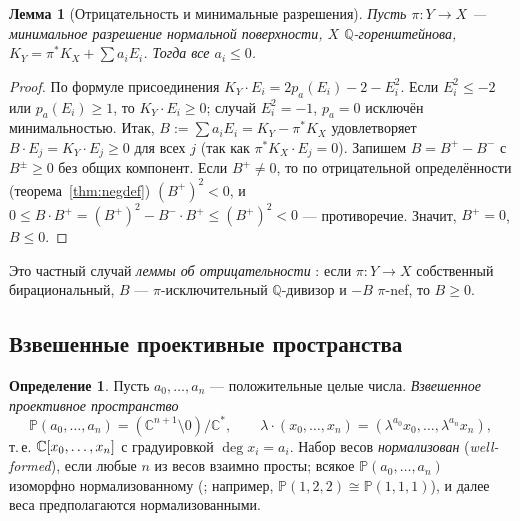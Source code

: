 \documentclass[11pt,a4paper]{article}
\theoremstyle{plain}
\newtheorem{lemma}[theorem]{Лемма}
\theoremstyle{definition}
\newtheorem{definition}[theorem]{Определение}
\theoremstyle{remark}
\renewcommand{\C}{\mathbb{C}}
\newcommand{\Q}{\mathbb{Q}}
\newcommand{\PP}{\mathbb{P}}
\let\Proj\relax
\DeclareMathOperator{\Proj}{Proj}
\begin{document}
\begin{lemma}[Отрицательность и минимальные разрешения]\label{lem:minimal-discrep}
Пусть $\pi\colon Y\to X$ --- минимальное разрешение нормальной поверхности, $X$ $\Q$-горенштейнова,
$K_Y=\pi^*K_X+\sum a_iE_i$. Тогда все $a_i\le0$.
\end{lemma}
\begin{proof}
По формуле присоединения \cite[V, упр.~1.3]{Ha} $K_Y\cdot E_i=2p_a(E_i)-2-E_i^2$. Если $E_i^2\le-2$ или
$p_a(E_i)\ge1$, то $K_Y\cdot E_i\ge0$; случай $E_i^2=-1$, $p_a=0$ исключён минимальностью. Итак,
$B:=\sum a_iE_i=K_Y-\pi^*K_X$ удовлетворяет $B\cdot E_j=K_Y\cdot E_j\ge0$ для всех $j$
(так как $\pi^*K_X\cdot E_j=0$). Запишем $B=B^+-B^-$ с $B^\pm\ge0$ без общих компонент. Если
$B^+\ne0$, то по отрицательной определённости (теорема~\ref{thm:negdef}) $(B^+)^2<0$, и
$0\le B\cdot B^+=(B^+)^2-B^-\cdot B^+\le(B^+)^2<0$ --- противоречие. Значит, $B^+=0$, $B\le0$.
\end{proof}

Это частный случай \emph{леммы об отрицательности} \cite[3.39]{KM}: если $\pi\colon Y\to X$
собственный бирациональный, $B$ --- $\pi$-исключительный $\Q$-дивизор и $-B$ $\pi$-nef, то $B\ge0$.

\subsection{Взвешенные проективные пространства}\label{ss:wps}

\begin{definition}
Пусть $a_0,\dots,a_n$ --- положительные целые числа. \emph{Взвешенное проективное пространство}
\[
\PP(a_0,\dots,a_n)=(\C^{n+1}\setminus0)/\C^*,\qquad \lambda\cdot(x_0,\dots,x_n)=(\lambda^{a_0}x_0,\dots,\lambda^{a_n}x_n),
\]
т.\,е. $\Proj\C[x_0,\dots,x_n]$ с градуировкой $\deg x_i=a_i$. Набор весов \emph{нормализован}
(\emph{well-formed}), если любые $n$ из весов взаимно просты; всякое $\PP(a_0,\dots,a_n)$
изоморфно нормализованному (\cite[1.3]{Dolg-WPS}; например, $\PP(1,2,2)\cong\PP(1,1,1)$), и далее
веса предполагаются нормализованными.
\end{definition}
\end{document}

